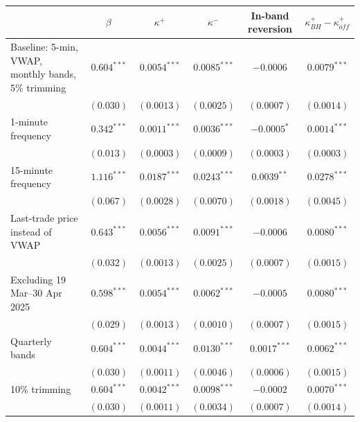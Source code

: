 \begin{tabular}{lccccc}
\toprule
 & $\beta$ & $\kappa^+$ & $\kappa^-$ & In-band reversion & $\kappa^+_{BH}-\kappa^+_{off}$ \\
\midrule
Baseline: 5-min, VWAP, monthly bands, 5\% trimming & $0.604^{***}$ & $0.0054^{***}$ & $0.0085^{***}$ & $-0.0006$ & $0.0079^{***}$ \\
 & $(0.030)$ & $(0.0013)$ & $(0.0025)$ & $(0.0007)$ & $(0.0014)$ \\
1-minute frequency & $0.342^{***}$ & $0.0011^{***}$ & $0.0036^{***}$ & $-0.0005^{*}$ & $0.0014^{***}$ \\
 & $(0.013)$ & $(0.0003)$ & $(0.0009)$ & $(0.0003)$ & $(0.0003)$ \\
15-minute frequency & $1.116^{***}$ & $0.0187^{***}$ & $0.0243^{***}$ & $0.0039^{**}$ & $0.0278^{***}$ \\
 & $(0.067)$ & $(0.0028)$ & $(0.0070)$ & $(0.0018)$ & $(0.0045)$ \\
Last-trade price instead of VWAP & $0.643^{***}$ & $0.0056^{***}$ & $0.0091^{***}$ & $-0.0006$ & $0.0080^{***}$ \\
 & $(0.032)$ & $(0.0013)$ & $(0.0025)$ & $(0.0007)$ & $(0.0015)$ \\
Excluding 19 Mar--30 Apr 2025 & $0.598^{***}$ & $0.0054^{***}$ & $0.0062^{***}$ & $-0.0005$ & $0.0080^{***}$ \\
 & $(0.029)$ & $(0.0013)$ & $(0.0010)$ & $(0.0007)$ & $(0.0015)$ \\
Quarterly bands & $0.604^{***}$ & $0.0044^{***}$ & $0.0130^{***}$ & $0.0017^{***}$ & $0.0062^{***}$ \\
 & $(0.030)$ & $(0.0011)$ & $(0.0046)$ & $(0.0006)$ & $(0.0015)$ \\
10\% trimming & $0.604^{***}$ & $0.0042^{***}$ & $0.0098^{***}$ & $-0.0002$ & $0.0070^{***}$ \\
 & $(0.030)$ & $(0.0011)$ & $(0.0034)$ & $(0.0007)$ & $(0.0014)$ \\
\bottomrule
\end{tabular}
